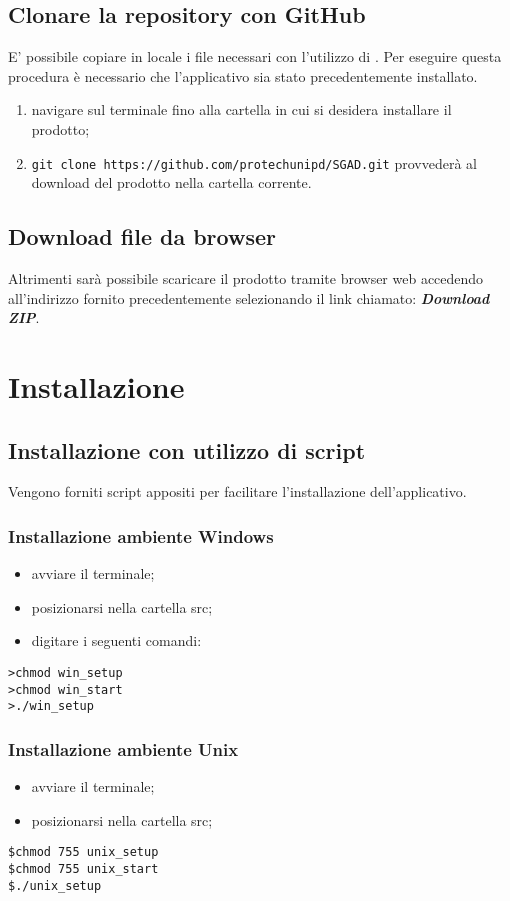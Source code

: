 \documentclass[12pt,a4paper]{article}
\begin{document}
	\subsection{Clonare la repository con GitHub}
	E' possibile copiare in locale i file necessari con l'utilizzo di . 
	Per eseguire questa procedura è necessario che l'applicativo  sia stato precedentemente installato.
	\begin{enumerate}
		\item navigare sul terminale fino alla cartella in cui si desidera installare il prodotto;
		\item \texttt{git clone https://github.com/protechunipd/SGAD.git} provvederà al download del prodotto nella cartella corrente. 
	\end{enumerate}
	
	\subsection{Download file da browser}
	Altrimenti sarà possibile scaricare il prodotto tramite browser web accedendo
	all’indirizzo fornito precedentemente selezionando il link chiamato: \textbf{\textit{Download ZIP}}.
	
	\section{Installazione}\label{install}
	\subsection{Installazione con utilizzo di script}
	Vengono forniti script appositi per facilitare l'installazione dell'applicativo. 
	
		\subsubsection{Installazione ambiente Windows}
		\begin{itemize}
			\item avviare il terminale;
			\item posizionarsi nella cartella src;
			\item digitare i seguenti comandi:	
		\end{itemize}	
		\begin{center}
				\texttt{>chmod win\_setup \\
					>chmod win\_start	 \\
					>./win\_setup} \\
		\end{center}
	
		\subsubsection{Installazione ambiente Unix}
		\begin{itemize}
			\item avviare il terminale;
			\item posizionarsi nella cartella src;
		
		\end{itemize}
			\begin{center}
				\texttt{\$chmod 755 unix\_setup \\
					\$chmod 755 unix\_start	 \\
					\$./unix\_setup }
					
			\end{center}
\end{document}
